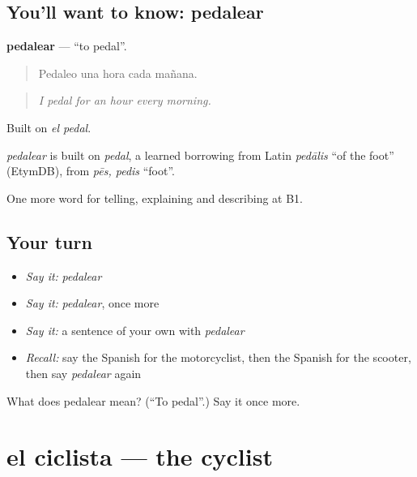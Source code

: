 \subsection*{You'll want to know: pedalear}
\textbf{pedalear} — \textquotedblleft{}to pedal\textquotedblright{}.

\begin{quote}
Pedaleo una hora cada mañana.
\end{quote}

\begin{quote}
\emph{I pedal for an hour every morning.}
\end{quote}

Built on \emph{el pedal}.

\begin{cousinweb}
\emph{pedalear} is built on \emph{pedal}, a learned borrowing from Latin \emph{pedālis} \textquotedblleft{}of the foot\textquotedblright{} (EtymDB), from \emph{pēs, pedis} \textquotedblleft{}foot\textquotedblright{}.
\end{cousinweb}

\begin{grammarlens}[title={What you've built}]
One more word for telling, explaining and describing at B1.
\end{grammarlens}

\subsection*{Your turn}
\begin{itemize}
\raggedright
  \item \emph{Say it:} \emph{pedalear}
  \item \emph{Say it:} \emph{pedalear}, once more
  \item \emph{Say it:} a sentence of your own with \emph{pedalear}
  \item \emph{Recall:} say the Spanish for the motorcyclist, then the Spanish for the scooter, then say \emph{pedalear} again
\end{itemize}

\begin{tcolorbox}[breakable,colback=teal!4,colframe=teal!35!black,title={Before you move on}]
What does pedalear mean? (\textquotedblleft{}To pedal\textquotedblright{}.) Say it once more.
\end{tcolorbox}
\section[el ciclista]{el ciclista — the cyclist}

